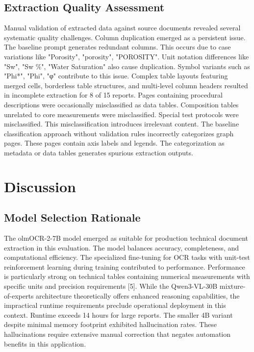 \documentclass{svproc}
\begin{document}
\subsection{Extraction Quality Assessment}

Manual validation of extracted data against source documents revealed several systematic quality challenges. Column duplication emerged as a persistent issue. The baseline prompt generates redundant columns. This occurs due to case variations like "Porosity", "porosity", "POROSITY". Unit notation differences like "Sw", "Sw \%", "Water Saturation" also cause duplication. Symbol variants such as "Phi*", "Phi", "φ" contribute to this issue. Complex table layouts featuring merged cells, borderless table structures, and multi-level column headers resulted in incomplete extraction for 8 of 15 reports. Pages containing procedural descriptions were occasionally misclassified as data tables. Composition tables unrelated to core measurements were misclassified. Special test protocols were misclassified. This misclassification introduces irrelevant content. The baseline classification approach without validation rules incorrectly categorizes graph pages. These pages contain axis labels and legends. The categorization as metadata or data tables generates spurious extraction outputs.

\section{Discussion}

\subsection{Model Selection Rationale}

The olmOCR-2-7B model emerged as suitable for production technical document extraction in this evaluation. The model balances accuracy, completeness, and computational efficiency. The specialized fine-tuning for OCR tasks with unit-test reinforcement learning during training contributed to performance. Performance is particularly strong on technical tables containing numerical measurements with specific units and precision requirements [5]. While the Qwen3-VL-30B mixture-of-experts architecture theoretically offers enhanced reasoning capabilities, the impractical runtime requirements preclude operational deployment in this context. Runtime exceeds 14 hours for large reports. The smaller 4B variant despite minimal memory footprint exhibited hallucination rates. These hallucinations require extensive manual correction that negates automation benefits in this application.
\end{document}
